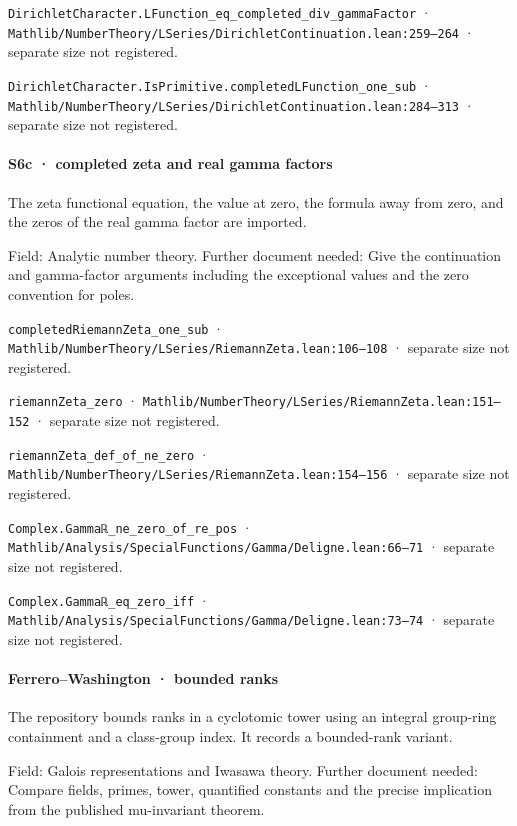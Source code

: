 \nolinkurl{DirichletCharacter.LFunction_eq_completed_div_gammaFactor} · \nolinkurl{Mathlib/NumberTheory/LSeries/DirichletContinuation.lean:259–264} · separate size not registered.

\nolinkurl{DirichletCharacter.IsPrimitive.completedLFunction_one_sub} · \nolinkurl{Mathlib/NumberTheory/LSeries/DirichletContinuation.lean:284–313} · separate size not registered.

\paragraph{S6c · completed zeta and real gamma factors}

The zeta functional equation, the value at zero, the formula away from zero, and the zeros of the real gamma factor are imported.

Field: Analytic number theory. Further document needed: Give the continuation and gamma-factor arguments including the exceptional values and the zero convention for poles.

\nolinkurl{completedRiemannZeta_one_sub} · \nolinkurl{Mathlib/NumberTheory/LSeries/RiemannZeta.lean:106–108} · separate size not registered.

\nolinkurl{riemannZeta_zero} · \nolinkurl{Mathlib/NumberTheory/LSeries/RiemannZeta.lean:151–152} · separate size not registered.

\nolinkurl{riemannZeta_def_of_ne_zero} · \nolinkurl{Mathlib/NumberTheory/LSeries/RiemannZeta.lean:154–156} · separate size not registered.

\nolinkurl{Complex.Gammaℝ_ne_zero_of_re_pos} · \nolinkurl{Mathlib/Analysis/SpecialFunctions/Gamma/Deligne.lean:66–71} · separate size not registered.

\nolinkurl{Complex.Gammaℝ_eq_zero_iff} · \nolinkurl{Mathlib/Analysis/SpecialFunctions/Gamma/Deligne.lean:73–74} · separate size not registered.

\paragraph{Ferrero–Washington · bounded ranks}

The repository bounds ranks in a cyclotomic tower using an integral group-ring containment and a class-group index. It records a bounded-rank variant.

Field: Galois representations and Iwasawa theory. Further document needed: Compare fields, primes, tower, quantified constants and the precise implication from the published mu-invariant theorem.

